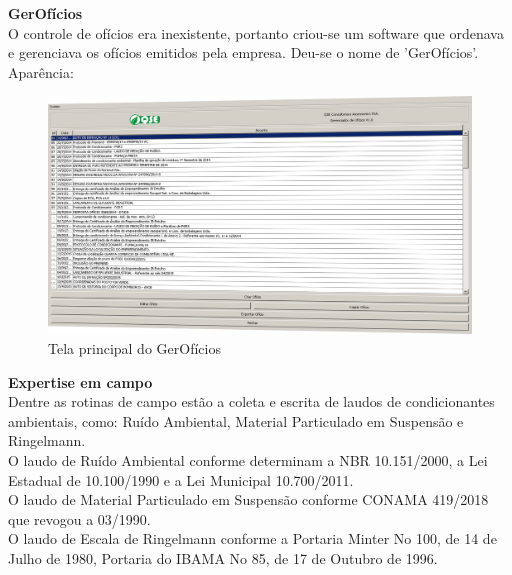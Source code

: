 \documentclass[12pt,a4paper,oneside,sumario=tradicional,brazil]{abntex2}
\begin{document}
\textbf{GerOfícios} \\
\indent
O controle de ofícios era inexistente, portanto criou-se um software que ordenava e gerenciava os ofícios emitidos pela empresa. Deu-se o nome de 'GerOfícios'. \\
\indent
Aparência: \\
\begin{figure}[H]
	\includegraphics[width=1\linewidth]{imgs/GerOficios-principal.png}
	\caption{Tela principal do GerOfícios}
\end{figure}

	\textbf{{\large Expertise em campo}} \\
	\indent
	Dentre as rotinas de campo estão a coleta e escrita de laudos de condicionantes ambientais, como: Ruído Ambiental, Material Particulado em Suspensão e Ringelmann. \\
	O laudo de Ruído Ambiental conforme determinam a NBR 10.151/2000, a Lei Estadual de 10.100/1990 e a Lei Municipal 10.700/2011. \\
	O laudo de Material Particulado em Suspensão conforme CONAMA 419/2018 que revogou a 03/1990. \\
	O laudo de Escala de Ringelmann conforme a Portaria Minter No 100, de 14 de Julho de 1980, Portaria do IBAMA No 85, de 17 de Outubro de 1996. \\
	
\end{document}
